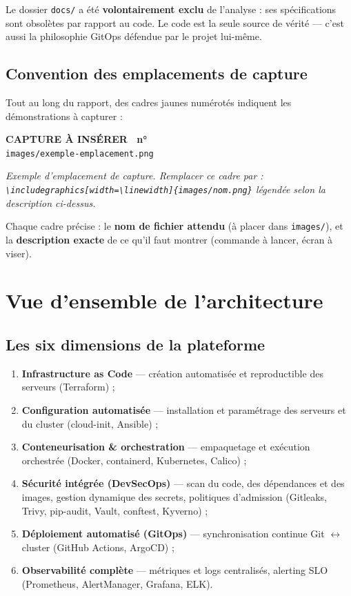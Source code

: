 \documentclass[12pt,a4paper]{article}
\newcounter{capturecount}
\newcommand{\capturebox}[2]{%
\par\vspace{4mm}
\begin{tcolorbox}[enhanced,colback=yellow!5,colframe=black!55,boxrule=0.7pt,
  borderline={0.7pt}{0pt}{black!40,dashed},
  arc=2mm,left=6pt,right=6pt,top=7pt,bottom=7pt]
\centering
{\normalsize\sffamily\bfseries CAPTURE À INSÉRER \textbar\ n°\,\stepcounter{capturecount}\thecapturecount}\\[3pt]
{\large\texttt{images/#2}}\\[7pt]
\begin{minipage}{0.94\linewidth}\centering\itshape #1\end{minipage}
\end{tcolorbox}
\par\vspace{2mm}}
\begin{document}
\begin{whybox}
Le dossier \texttt{docs/} a été \textbf{volontairement exclu} de l'analyse : ses spécifications sont obsolètes par rapport au code. Le code est la seule source de vérité --- c'est aussi la philosophie GitOps défendue par le projet lui-même.
\end{whybox}

\subsection{Convention des emplacements de capture}
Tout au long du rapport, des cadres jaunes numérotés indiquent les démonstrations à capturer :

\capturebox{Exemple d'emplacement de capture. Remplacer ce cadre par :
\texttt{\textbackslash includegraphics[width=\textbackslash linewidth]\{images/nom.png\}}
légendée selon la description ci-dessus.}{exemple-emplacement.png}

Chaque cadre précise : le \textbf{nom de fichier attendu} (à placer dans \texttt{images/}), et la \textbf{description exacte} de ce qu'il faut montrer (commande à lancer, écran à viser).

\section{Vue d'ensemble de l'architecture}

\subsection{Les six dimensions de la plateforme}

\begin{enumerate}[itemsep=2pt]
  \item \textbf{Infrastructure as Code} --- création automatisée et reproductible des serveurs (Terraform) ;
  \item \textbf{Configuration automatisée} --- installation et paramétrage des serveurs et du cluster (cloud-init, Ansible) ;
  \item \textbf{Conteneurisation \& orchestration} --- empaquetage et exécution orchestrée (Docker, containerd, Kubernetes, Calico) ;
  \item \textbf{Sécurité intégrée (DevSecOps)} --- scan du code, des dépendances et des images, gestion dynamique des secrets, politiques d'admission (Gitleaks, Trivy, pip-audit, Vault, conftest, Kyverno) ;
  \item \textbf{Déploiement automatisé (GitOps)} --- synchronisation continue Git $\leftrightarrow$ cluster (GitHub Actions, ArgoCD) ;
  \item \textbf{Observabilité complète} --- métriques et logs centralisés, alerting SLO (Prometheus, AlertManager, Grafana, ELK).
\end{enumerate}
\end{document}
